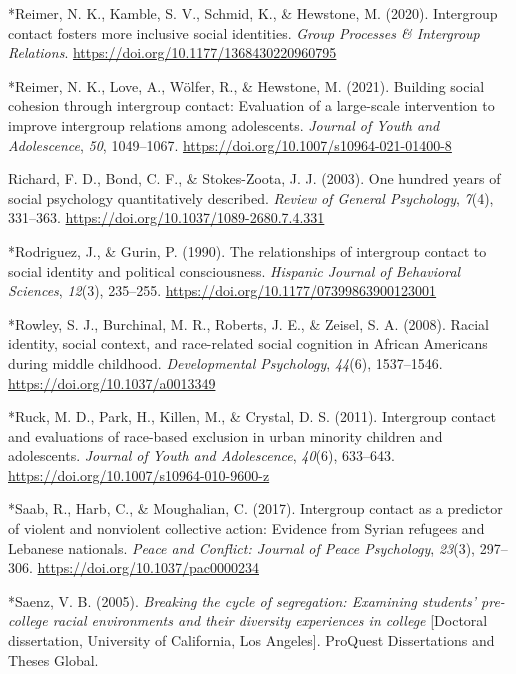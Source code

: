 \documentclass[12pt, letterpaper]{article}
\begin{document}
\leavevmode\hypertarget{ref-2380}{}%
*Reimer, N. K., Kamble, S. V., Schmid, K., \& Hewstone, M. (2020).
Intergroup contact fosters more inclusive social identities. \emph{Group
Processes \& Intergroup Relations}.
\url{https://doi.org/10.1177/1368430220960795}

\leavevmode\hypertarget{ref-2399}{}%
*Reimer, N. K., Love, A., Wölfer, R., \& Hewstone, M. (2021). Building
social cohesion through intergroup contact: Evaluation of a large-scale
intervention to improve intergroup relations among adolescents.
\emph{Journal of Youth and Adolescence}, \emph{50}, 1049--1067.
\url{https://doi.org/10.1007/s10964-021-01400-8}

\leavevmode\hypertarget{ref-richard_one_2003}{}%
Richard, F. D., Bond, C. F., \& Stokes-Zoota, J. J. (2003). One hundred
years of social psychology quantitatively described. \emph{Review of
General Psychology}, \emph{7}(4), 331--363.
\url{https://doi.org/10.1037/1089-2680.7.4.331}

\leavevmode\hypertarget{ref-803}{}%
*Rodriguez, J., \& Gurin, P. (1990). The relationships of intergroup
contact to social identity and political consciousness. \emph{Hispanic
Journal of Behavioral Sciences}, \emph{12}(3), 235--255.
\url{https://doi.org/10.1177/07399863900123001}

\leavevmode\hypertarget{ref-703}{}%
*Rowley, S. J., Burchinal, M. R., Roberts, J. E., \& Zeisel, S. A.
(2008). Racial identity, social context, and race-related social
cognition in African Americans during middle childhood.
\emph{Developmental Psychology}, \emph{44}(6), 1537--1546.
\url{https://doi.org/10.1037/a0013349}

\leavevmode\hypertarget{ref-244}{}%
*Ruck, M. D., Park, H., Killen, M., \& Crystal, D. S. (2011). Intergroup
contact and evaluations of race-based exclusion in urban minority
children and adolescents. \emph{Journal of Youth and Adolescence},
\emph{40}(6), 633--643. \url{https://doi.org/10.1007/s10964-010-9600-z}

\leavevmode\hypertarget{ref-1114}{}%
*Saab, R., Harb, C., \& Moughalian, C. (2017). Intergroup contact as a
predictor of violent and nonviolent collective action: Evidence from
Syrian refugees and Lebanese nationals. \emph{Peace and Conflict:
Journal of Peace Psychology}, \emph{23}(3), 297--306.
\url{https://doi.org/10.1037/pac0000234}

\leavevmode\hypertarget{ref-2333}{}%
*Saenz, V. B. (2005). \emph{Breaking the cycle of segregation: Examining
students' pre-college racial environments and their diversity
experiences in college} {[}Doctoral dissertation, University of
California, Los Angeles{]}. ProQuest Dissertations and Theses Global.
\end{document}
